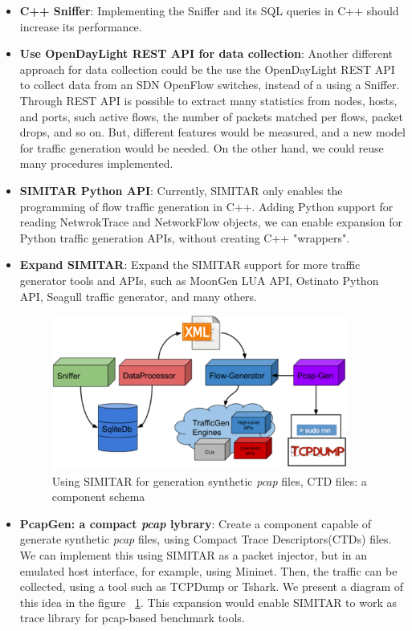 \begin{itemize}
	
	\item \textbf{C++ Sniffer}: Implementing the Sniffer and its SQL queries in C++ should increase its performance.
	
	\item \textbf{Use OpenDayLight REST API for data collection}: Another different approach for data collection could be the use the OpenDayLight REST API to collect data from an SDN OpenFlow switches, instead of a using a Sniffer. Through REST API is possible to extract many statistics from nodes, hosts, and ports, such active flows, the number of packets matched per flows, packet drops, and so on. But, different features would be measured,  and a new model for traffic generation would be needed. On the other hand, we could reuse many procedures implemented.  
	
	\item \textbf{SIMITAR Python API}: Currently, SIMITAR only enables the programming of flow traffic generation in C++. Adding Python support for reading NetwrokTrace and NetworkFlow objects, we can enable expansion for Python traffic generation APIs, without creating C++ "wrappers".
	
	\item \textbf{Expand SIMITAR}: Expand the SIMITAR support for more traffic generator tools and APIs, such as MoonGen LUA API, Ostinato Python API, Seagull traffic generator, and many others.
	
	\begin{figure}[!ht]
		\centering
		\includegraphics[height=2.0in]{figures/ch6/pcap-gen}
		\caption{Using SIMITAR for generation synthetic \textit{pcap} files, CTD files: a component schema}
		\label{fig:pcap-gen}
	\end{figure}
	
	\item \textbf{PcapGen: a compact \textit{pcap} lybrary}: Create a component capable of generate synthetic \textit{pcap} files, using Compact Trace Descriptors(CTDs) files. We can implement this using SIMITAR as a packet injector, but in an emulated host interface, for example, using Mininet. Then, the traffic can be collected, using a tool such as TCPDump or Tshark. We present a diagram of this idea in the figure ~\ref{fig:pcap-gen}. This expansion would enable SIMITAR  to work as trace library for pcap-based benchmark tools.
	
	
	
\end{itemize}











